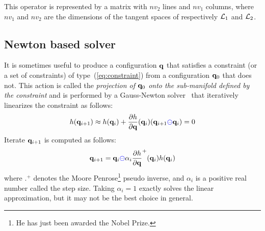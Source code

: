 This operator is represented by a matrix with $nv_2$ lines and $nv_1$ columns, where $nv_1$ and $nv_2$ are the dimensions of the tangent spaces of respectively $\mathcal{L}_1$ and $\mathcal{L}_2$.

\subsection{Newton based solver}

It is sometimes useful to produce a configuration $\mathbf{q}$ that satisfies a constraint (or a set of constraints) of type~(\ref{eq:constraint}) from a configuration $\mathbf{q}_0$ that does not. This action is called the \textit{projection of $\mathbf{q}_0$ onto the sub-manifold defined by the constraint} and is performed by a Gauss-Newton solver~\cite[Chapter~10]{NoceWrig06} that iteratively linearizes the constraint as follows:
$$
h(\mathbf{q}_{i+1}) \approx h(\mathbf{q}_i) + \frac{\partial h}{\partial \mathbf{q}}(\mathbf{q}_{i})(\mathbf{q}_{i+1}{\color{blue}\ominus}\mathbf{q}_i) = 0
$$
Iterate $\mathbf{q}_{i+1}$ is computed as follows:
\begin{equation}\label{eq:HierarchicalIterative}
\conf_{i+1} = \conf_i{\color{blue}\ominus}\alpha_i\frac{\partial h}{\partial \conf}^{+}(\conf_{i}) h(\conf_i)
\end{equation}
where $.^{+}$ denotes the Moore Penrose\footnote{He has just been awarded the Nobel Prize.} pseudo inverse, and $\alpha_i$ is a positive real number called the step size. Taking $\alpha_i=1$ exactly solves the linear approximation, but it may not be the best choice in general.

